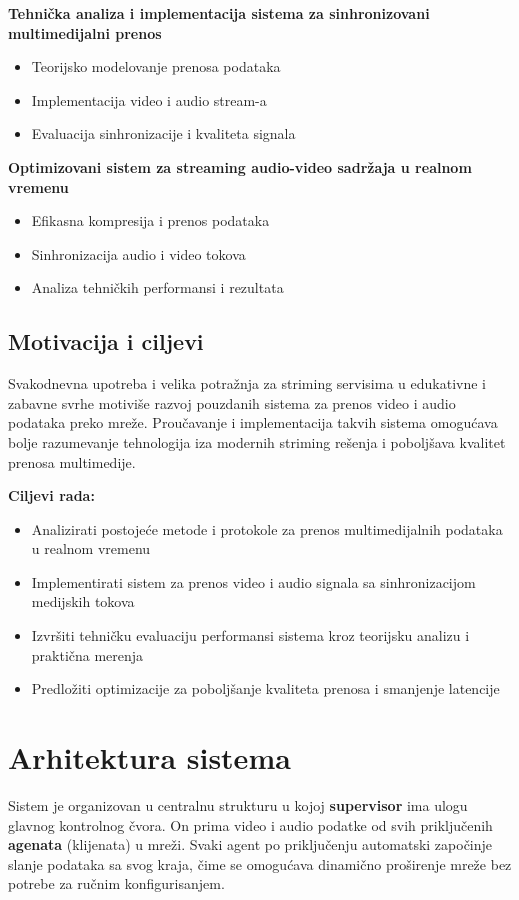 \documentclass[a4paper,12pt]{article}
\begin{document}
\textbf{Tehnička analiza i implementacija sistema za sinhronizovani multimedijalni prenos}
\begin{itemize}
    \item Teorijsko modelovanje prenosa podataka
    \item Implementacija video i audio stream-a
    \item Evaluacija sinhronizacije i kvaliteta signala
\end{itemize}

\textbf{Optimizovani sistem za streaming audio-video sadržaja u realnom vremenu}
\begin{itemize}
    \item Efikasna kompresija i prenos podataka
    \item Sinhronizacija audio i video tokova
    \item Analiza tehničkih performansi i rezultata
\end{itemize}

\subsection{Motivacija i ciljevi}

Svakodnevna upotreba i velika potražnja za striming servisima u edukativne i zabavne svrhe motiviše razvoj pouzdanih sistema za prenos video i audio podataka preko mreže. Proučavanje i implementacija takvih sistema omogućava bolje razumevanje tehnologija iza modernih striming rešenja i poboljšava kvalitet prenosa multimedije.

\textbf{Ciljevi rada:}
\begin{itemize}
    \item Analizirati postojeće metode i protokole za prenos multimedijalnih podataka u realnom vremenu
    \item Implementirati sistem za prenos video i audio signala sa sinhronizacijom medijskih tokova
    \item Izvršiti tehničku evaluaciju performansi sistema kroz teorijsku analizu i praktična merenja
    \item Predložiti optimizacije za poboljšanje kvaliteta prenosa i smanjenje latencije
\end{itemize}

\newpage
\section{Arhitektura sistema}

Sistem je organizovan u centralnu strukturu u kojoj \textbf{supervisor} ima ulogu glavnog kontrolnog čvora. On prima video i audio podatke od svih priključenih \textbf{agenata} (klijenata) u mreži. Svaki agent po priključenju automatski započinje slanje podataka sa svog kraja, čime se omogućava dinamično proširenje mreže bez potrebe za ručnim konfigurisanjem.
\end{document}

